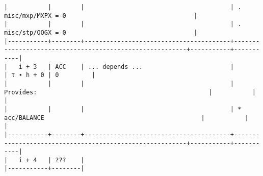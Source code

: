 \documentclass[varwidth=\maxdimen,margin=0.5cm,multi={verbatim}]{standalone}
\begin{document}
\begin{verbatim}
|           |        |                                        | .   misc/mxp/MXPX = 0                                   |
|           |        |                                        | .   misc/stp/OOGX = 0                                   |
|-----------+--------+----------------------------------------+---------------------------------------------------------+-----------+-----------|
|   i + 3   | ACC    | ... depends ...                        |                                                         | τ ∙ h + 0 | 0         |
|           |        |                                        | Provides:                                               |           |           |
|           |        |                                        | * acc/BALANCE                                           |           |           |
|-----------+--------+----------------------------------------+---------------------------------------------------------+-----------+-----------|
|   i + 4   | ???    |
|-----------+--------|

\end{verbatim}
\end{document}
